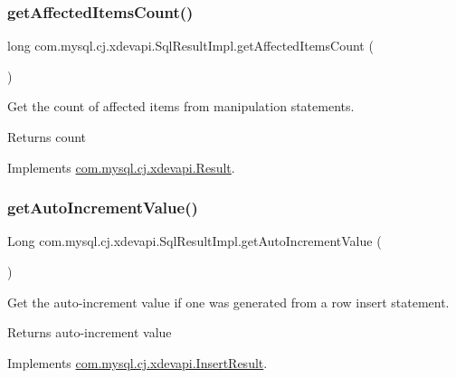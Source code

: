 \subsubsection{\texorpdfstring{get\+Affected\+Items\+Count()}{getAffectedItemsCount()}}
{\footnotesize\ttfamily long com.\+mysql.\+cj.\+xdevapi.\+Sql\+Result\+Impl.\+get\+Affected\+Items\+Count (\begin{DoxyParamCaption}{ }\end{DoxyParamCaption})}

Get the count of affected items from manipulation statements.

\begin{DoxyReturn}{Returns}
count 
\end{DoxyReturn}


Implements \mbox{\hyperlink{interfacecom_1_1mysql_1_1cj_1_1xdevapi_1_1_result_a6389cfd50f26c8efc0120b5f3072d228}{com.\+mysql.\+cj.\+xdevapi.\+Result}}.

\mbox{\label{classcom_1_1mysql_1_1cj_1_1xdevapi_1_1_sql_result_impl_ac1730d1c9d94a55bd5519e803be617e4}} 
\subsubsection{\texorpdfstring{get\+Auto\+Increment\+Value()}{getAutoIncrementValue()}}
{\footnotesize\ttfamily Long com.\+mysql.\+cj.\+xdevapi.\+Sql\+Result\+Impl.\+get\+Auto\+Increment\+Value (\begin{DoxyParamCaption}{ }\end{DoxyParamCaption})}

Get the auto-\/increment value if one was generated from a row insert statement.

\begin{DoxyReturn}{Returns}
auto-\/increment value 
\end{DoxyReturn}


Implements \mbox{\hyperlink{interfacecom_1_1mysql_1_1cj_1_1xdevapi_1_1_insert_result_a32144e23568f91aa21dab0b01cb6b14e}{com.\+mysql.\+cj.\+xdevapi.\+Insert\+Result}}.

